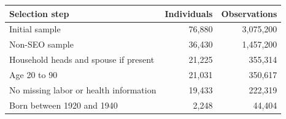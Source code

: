 \begin{tabular}{@{}l r r@{}}
\toprule
Selection step & Individuals & Observations \\
\midrule
Initial sample & 76,880 & 3,075,200 \\
Non-SEO sample & 36,430 & 1,457,200 \\
Household heads and spouse if present & 21,225 & 355,314 \\
Age 20 to 90 & 21,031 & 350,617 \\
No missing labor or health information & 19,433 & 222,319 \\
Born between 1920 and 1940 & 2,248 & 44,404 \\
\bottomrule
\end{tabular}
